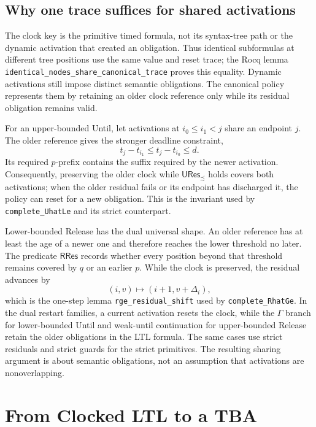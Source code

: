 \documentclass[10pt,journal,compsoc]{IEEEtran}
\begin{document}
\subsection{Why one trace suffices for shared activations}
The clock key is the primitive timed formula, not its syntax-tree path or the
dynamic activation that created an obligation. Thus identical subformulas at
different tree positions use the same value and reset trace; the Rocq lemma
\texttt{identical\_nodes\_share\_canonical\_trace} proves this equality.
Dynamic activations still impose distinct semantic obligations. The canonical
policy represents them by retaining an older clock reference only while its
residual obligation remains valid.

For an upper-bounded Until, let activations at $i_0\le i_1<j$ share an
endpoint $j$. The older reference gives the stronger deadline constraint,
\[
 t_j-t_{i_1}\le t_j-t_{i_0}\le d.
\]
Its required $p$-prefix contains the suffix required by the newer activation.
Consequently, preserving the older clock while
$\mathsf{URes}_{\precsim}$ holds covers both activations; when the older
residual fails or its endpoint has discharged it, the policy can reset for a
new obligation. This is the invariant used by
\texttt{complete\_UhatLe} and its strict counterpart.

Lower-bounded Release has the dual universal shape. An older reference has at
least the age of a newer one and therefore reaches the lower threshold no
later. The predicate $\mathsf{RRes}$ records whether every position beyond
that threshold remains covered by $q$ or an earlier $p$. While the clock is
preserved, the residual advances by
\[
 (i,v)\longmapsto(i+1,v+\Delta_i),
\]
which is the one-step lemma \texttt{rge\_residual\_shift} used by
\texttt{complete\_RhatGe}. In the dual restart families, a current
activation resets the clock, while the $\Gamma$ branch for lower-bounded
Until and weak-until continuation for upper-bounded Release retain the older
obligations in the LTL formula. The same cases use strict residuals and strict
guards for the strict primitives. The resulting sharing argument is about
semantic obligations, not an assumption that activations are nonoverlapping.

\section{From Clocked LTL to a TBA}
\label{sec:tba-construction}
\end{document}
